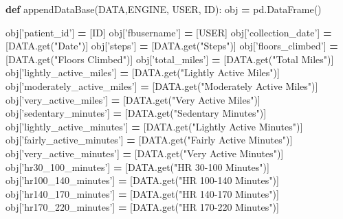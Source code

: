\documentclass[]{book}
\newenvironment{Shaded}{\begin{snugshade}}{\end{snugshade}}
\newcommand{\KeywordTok}[1]{\textcolor[rgb]{0.13,0.29,0.53}{\textbf{#1}}}
\newcommand{\NormalTok}[1]{#1}
\newcommand{\OperatorTok}[1]{\textcolor[rgb]{0.81,0.36,0.00}{\textbf{#1}}}
\newcommand{\StringTok}[1]{\textcolor[rgb]{0.31,0.60,0.02}{#1}}
\begin{document}
\begin{Shaded}
\begin{Highlighting}[]
\KeywordTok{def}\NormalTok{ appendDataBase(DATA,ENGINE, USER, ID):}
\NormalTok{    obj }\OperatorTok{=}\NormalTok{ pd.DataFrame()}
   
\NormalTok{    obj[}\StringTok{'patient_id'}\NormalTok{] }\OperatorTok{=}\NormalTok{ [ID]}
\NormalTok{    obj[}\StringTok{'fbusername'}\NormalTok{] }\OperatorTok{=}\NormalTok{ [USER]}
\NormalTok{    obj[}\StringTok{'collection_date'}\NormalTok{] }\OperatorTok{=}\NormalTok{ [DATA.get(}\StringTok{"Date"}\NormalTok{)]}
\NormalTok{    obj[}\StringTok{'steps'}\NormalTok{] }\OperatorTok{=}\NormalTok{ [DATA.get(}\StringTok{"Steps"}\NormalTok{)]}
\NormalTok{    obj[}\StringTok{'floors_climbed'}\NormalTok{] }\OperatorTok{=}\NormalTok{ [DATA.get(}\StringTok{"Floors Climbed"}\NormalTok{)]}
\NormalTok{    obj[}\StringTok{'total_miles'}\NormalTok{] }\OperatorTok{=}\NormalTok{ [DATA.get(}\StringTok{"Total Miles"}\NormalTok{)]}
\NormalTok{    obj[}\StringTok{'lightly_active_miles'}\NormalTok{] }\OperatorTok{=}\NormalTok{ [DATA.get(}\StringTok{"Lightly Active Miles"}\NormalTok{)]}
\NormalTok{    obj[}\StringTok{'moderately_active_miles'}\NormalTok{] }\OperatorTok{=}\NormalTok{ [DATA.get(}\StringTok{"Moderately Active Miles"}\NormalTok{)]}
\NormalTok{    obj[}\StringTok{'very_active_miles'}\NormalTok{] }\OperatorTok{=}\NormalTok{ [DATA.get(}\StringTok{"Very Active Miles"}\NormalTok{)]}
\NormalTok{    obj[}\StringTok{'sedentary_minutes'}\NormalTok{] }\OperatorTok{=}\NormalTok{ [DATA.get(}\StringTok{"Sedentary Minutes"}\NormalTok{)]}
\NormalTok{    obj[}\StringTok{'lightly_active_minutes'}\NormalTok{] }\OperatorTok{=}\NormalTok{ [DATA.get(}\StringTok{"Lightly Active Minutes"}\NormalTok{)]}
\NormalTok{    obj[}\StringTok{'fairly_active_minutes'}\NormalTok{] }\OperatorTok{=}\NormalTok{ [DATA.get(}\StringTok{"Fairly Active Minutes"}\NormalTok{)]}
\NormalTok{    obj[}\StringTok{'very_active_minutes'}\NormalTok{] }\OperatorTok{=}\NormalTok{ [DATA.get(}\StringTok{"Very Active Minutes"}\NormalTok{)]}
\NormalTok{    obj[}\StringTok{'hr30_100_minutes'}\NormalTok{] }\OperatorTok{=}\NormalTok{ [DATA.get(}\StringTok{"HR 30-100 Minutes"}\NormalTok{)]}
\NormalTok{    obj[}\StringTok{'hr100_140_minutes'}\NormalTok{] }\OperatorTok{=}\NormalTok{ [DATA.get(}\StringTok{"HR 100-140 Minutes"}\NormalTok{)]}
\NormalTok{    obj[}\StringTok{'hr140_170_minutes'}\NormalTok{] }\OperatorTok{=}\NormalTok{ [DATA.get(}\StringTok{"HR 140-170 Minutes"}\NormalTok{)]}
\NormalTok{    obj[}\StringTok{'hr170_220_minutes'}\NormalTok{] }\OperatorTok{=}\NormalTok{ [DATA.get(}\StringTok{"HR 170-220 Minutes"}\NormalTok{)]}

\end{Highlighting}
\end{Shaded}
\end{document}
